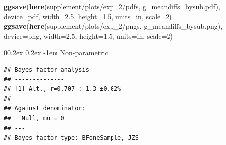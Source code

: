\documentclass[
  doc,floatsintext]{apa6}
\makeatletter
\newenvironment{Shaded}{\begin{snugshade}}{\end{snugshade}}
\newcommand{\AttributeTok}[1]{\textcolor[rgb]{0.13,0.29,0.53}{#1}}
\newcommand{\CommentTok}[1]{\textcolor[rgb]{0.56,0.35,0.01}{\textit{#1}}}
\newcommand{\DecValTok}[1]{\textcolor[rgb]{0.00,0.00,0.81}{#1}}
\newcommand{\FloatTok}[1]{\textcolor[rgb]{0.00,0.00,0.81}{#1}}
\newcommand{\FunctionTok}[1]{\textcolor[rgb]{0.13,0.29,0.53}{\textbf{#1}}}
\newcommand{\NormalTok}[1]{#1}
\newcommand{\OtherTok}[1]{\textcolor[rgb]{0.56,0.35,0.01}{#1}}
\newcommand{\SpecialCharTok}[1]{\textcolor[rgb]{0.81,0.36,0.00}{\textbf{#1}}}
\newcommand{\StringTok}[1]{\textcolor[rgb]{0.31,0.60,0.02}{#1}}
\let\oldparagraph\paragraph
\renewcommand{\paragraph}{
    \@ifstar
      \xxxParagraphStar
      \xxxParagraphNoStar
  }
\newcommand{\xxxParagraphStar}[1]{\oldparagraph*{#1}\mbox{}}
\newcommand{\xxxParagraphNoStar}[1]{\oldparagraph{#1}\mbox{}}
\renewcommand{\paragraph}{\@startsection{paragraph}{4}{\parindent}%
  {0\baselineskip \@plus 0.2ex \@minus 0.2ex}%
  {-1em}%
  {\normalfont\normalsize\bfseries\itshape\typesectitle}}
\makeatother
\begin{document}
\begin{Shaded}
\begin{Highlighting}[]
\FunctionTok{ggsave}\NormalTok{(}\FunctionTok{here}\NormalTok{(}\StringTok{\textquotesingle{}supplement/plots/exp\_2/pdfs\textquotesingle{}}\NormalTok{, }\StringTok{\textquotesingle{}g\_meandiffs\_bysub.pdf\textquotesingle{}}\NormalTok{),}
       \AttributeTok{device=}\StringTok{\textquotesingle{}pdf\textquotesingle{}}\NormalTok{, }\AttributeTok{width=}\FloatTok{2.5}\NormalTok{, }\AttributeTok{height=}\FloatTok{1.5}\NormalTok{, }\AttributeTok{units=}\StringTok{\textquotesingle{}in\textquotesingle{}}\NormalTok{, }\AttributeTok{scale=}\DecValTok{2}\NormalTok{)}
\FunctionTok{ggsave}\NormalTok{(}\FunctionTok{here}\NormalTok{(}\StringTok{\textquotesingle{}supplement/plots/exp\_2/pngs\textquotesingle{}}\NormalTok{, }\StringTok{\textquotesingle{}g\_meandiffs\_bysub.png\textquotesingle{}}\NormalTok{), }
       \AttributeTok{device=}\StringTok{\textquotesingle{}png\textquotesingle{}}\NormalTok{, }\AttributeTok{width=}\FloatTok{2.5}\NormalTok{, }\AttributeTok{height=}\FloatTok{1.5}\NormalTok{, }\AttributeTok{units=}\StringTok{\textquotesingle{}in\textquotesingle{}}\NormalTok{, }\AttributeTok{scale=}\DecValTok{2}\NormalTok{)}
\end{Highlighting}
\end{Shaded}

\paragraph{Non-parametric}\label{non-parametric-1}

\begin{Shaded}
\end{Shaded}

\begin{verbatim}
## Bayes factor analysis
## --------------
## [1] Alt., r=0.707 : 1.3 ±0.02%
## 
## Against denominator:
##   Null, mu = 0 
## ---
## Bayes factor type: BFoneSample, JZS
\end{verbatim}

\begin{Shaded}
\end{Shaded}
\end{document}
